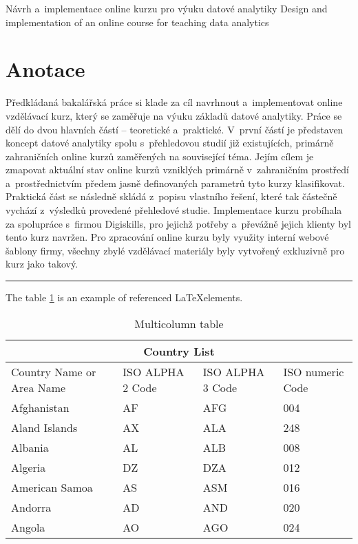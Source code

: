 Návrh a~implementace online kurzu pro výuku datové analytiky Design and
implementation of an online course for teaching data analytics

\chapter*{Anotace}

Předkládaná bakalářská práce si klade za cíl navrhnout a~implementovat
online vzdělávací kurz, který se zaměřuje na výuku základů datové
analytiky. Práce se dělí do dvou hlavních částí -- teoretické
a~praktické. V~první částí je představen koncept datové analytiky spolu
s~přehledovou studií již existujících, primárně zahraničních online kurzů
zaměřených na související téma. Jejím cílem je zmapovat aktuální stav
online kurzů vzniklých primárně v~zahraničním prostředí
a~prostřednictvím předem jasně definovaných parametrů tyto kurzy
klasifikovat. Praktická část se následně skládá z~popisu vlastního
řešení, které tak částečně vychází z~výsledků provedené přehledové
studie. Implementace kurzu probíhala za spolupráce s~firmou Digiskills,
pro jejichž potřeby a~převážně jejich klienty byl tento kurz navržen.
Pro zpracování online kurzu byly využity interní webové šablony firmy,
všechny zbylé vzdělávací materiály byly vytvořený exkluzivně pro kurz
jako takový.

\begin{center}\rule{0.5\linewidth}{0.5pt}\end{center}

The table \ref{table:1} is an example of referenced \LaTeX elements.

\begin{table}[h!]
\centering
\caption{Multicolumn table}
\begin{tabular}{ |p{3cm}||p{3cm}|p{3cm}|p{3cm}|  }
 \hline
 \multicolumn{4}{|c|}{Country List} \\
 \hline
 Country Name    or Area Name& ISO ALPHA 2 Code &ISO ALPHA 3 Code&ISO numeric Code\\
 \hline
 Afghanistan    & AF    &AFG&   004\\
 Aland Islands& AX  & ALA   &248\\
 Albania    &AL & ALB&  008\\
 Algeria    &DZ & DZA&  012\\
 American Samoa&    AS  & ASM&016\\
 Andorra&   AD  & AND   &020\\
 Angola&    AO  & AGO&024\\
  \hline
 \end{tabular}
 \label{table:1}
 \end{table}

